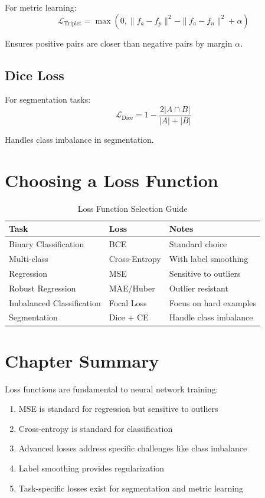 For metric learning:
\begin{equation}
\mathcal{L}_{\text{Triplet}} = \max(0, \|f_a - f_p\|^2 - \|f_a - f_n\|^2 + \alpha)
\end{equation}

Ensures positive pairs are closer than negative pairs by margin $\alpha$.

\subsection{Dice Loss}

For segmentation tasks:
\begin{equation}
\mathcal{L}_{\text{Dice}} = 1 - \frac{2|A \cap B|}{|A| + |B|}
\end{equation}

Handles class imbalance in segmentation.

\section{Choosing a Loss Function}

\begin{table}[h]
    \centering
    \caption{Loss Function Selection Guide}
    \begin{tabular}{L{2.5cm} L{4cm} L{4cm}}
        \toprule
        \textbf{Task} & \textbf{Loss} & \textbf{Notes} \\
        \midrule
        Binary Classification & BCE & Standard choice \\
        Multi-class & Cross-Entropy & With label smoothing \\
        Regression & MSE & Sensitive to outliers \\
        Robust Regression & MAE/Huber & Outlier resistant \\
        Imbalanced Classification & Focal Loss & Focus on hard examples \\
        Segmentation & Dice + CE & Handle class imbalance \\
        \bottomrule
    \end{tabular}
\end{table}

\section{Chapter Summary}

Loss functions are fundamental to neural network training:
\begin{enumerate}
    \item MSE is standard for regression but sensitive to outliers
    \item Cross-entropy is standard for classification
    \item Advanced losses address specific challenges like class imbalance
    \item Label smoothing provides regularization
    \item Task-specific losses exist for segmentation and metric learning
\end{enumerate}

